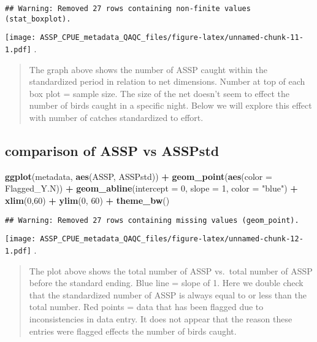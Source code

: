 \documentclass[
]{article}
\newenvironment{Shaded}{\begin{snugshade}}{\end{snugshade}}
\newcommand{\DataTypeTok}[1]{\textcolor[rgb]{0.13,0.29,0.53}{#1}}
\newcommand{\DecValTok}[1]{\textcolor[rgb]{0.00,0.00,0.81}{#1}}
\newcommand{\KeywordTok}[1]{\textcolor[rgb]{0.13,0.29,0.53}{\textbf{#1}}}
\newcommand{\NormalTok}[1]{#1}
\newcommand{\OperatorTok}[1]{\textcolor[rgb]{0.81,0.36,0.00}{\textbf{#1}}}
\newcommand{\StringTok}[1]{\textcolor[rgb]{0.31,0.60,0.02}{#1}}
\begin{document}
\begin{verbatim}
## Warning: Removed 27 rows containing non-finite values (stat_boxplot).
\end{verbatim}

\texttt{[image: ASSP\_CPUE\_metadata\_QAQC\_files/figure-latex/unnamed-chunk-11-1.pdf]}
.

\begin{quote}
The graph above shows the number of ASSP caught within the standardized
period in relation to net dimensions. Number at top of each box plot =
sample size. The size of the net doesn't seem to effect the number of
birds caught in a specific night. Below we will explore this effect with
number of catches standardized to effort.
\end{quote}

\hypertarget{comparison-of-assp-vs-asspstd}{%
\subsection{comparison of ASSP vs
ASSPstd}\label{comparison-of-assp-vs-asspstd}}

\begin{Shaded}
\begin{Highlighting}[]
\KeywordTok{ggplot}\NormalTok{(metadata, }\KeywordTok{aes}\NormalTok{(ASSP, ASSPstd)) }\OperatorTok{+}
\StringTok{  }\KeywordTok{geom_point}\NormalTok{(}\KeywordTok{aes}\NormalTok{(}\DataTypeTok{color =}\NormalTok{ Flagged_Y.N)) }\OperatorTok{+}
\StringTok{  }\KeywordTok{geom_abline}\NormalTok{(}\DataTypeTok{intercept =} \DecValTok{0}\NormalTok{, }\DataTypeTok{slope =} \DecValTok{1}\NormalTok{, }\DataTypeTok{color =} \StringTok{"blue"}\NormalTok{) }\OperatorTok{+}
\StringTok{  }\KeywordTok{xlim}\NormalTok{(}\DecValTok{0}\NormalTok{,}\DecValTok{60}\NormalTok{) }\OperatorTok{+}\StringTok{ }\KeywordTok{ylim}\NormalTok{(}\DecValTok{0}\NormalTok{, }\DecValTok{60}\NormalTok{) }\OperatorTok{+}
\StringTok{  }\KeywordTok{theme_bw}\NormalTok{()}
\end{Highlighting}
\end{Shaded}

\begin{verbatim}
## Warning: Removed 27 rows containing missing values (geom_point).
\end{verbatim}

\texttt{[image: ASSP\_CPUE\_metadata\_QAQC\_files/figure-latex/unnamed-chunk-12-1.pdf]}
.

\begin{quote}
The plot above shows the total number of ASSP vs.~total number of ASSP
before the standard ending. Blue line = slope of 1. Here we double check
that the standardized number of ASSP is always equal to or less than the
total number. Red points = data that has been flagged due to
inconsistencies in data entry. It does not appear that the reason these
entries were flagged effects the number of birds caught.
\end{quote}
\end{document}
